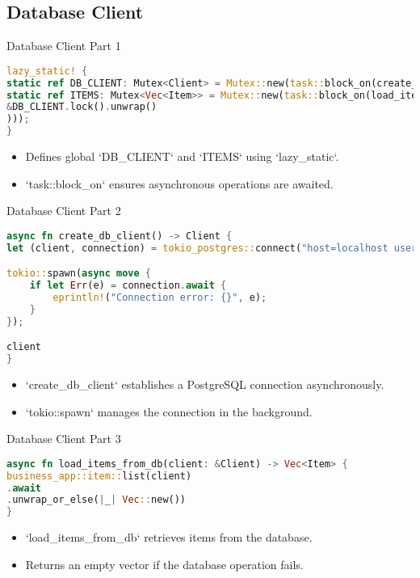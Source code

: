 \documentclass[aspectratio=169, table]{beamer}
\begin{document}
\subsection{Database Client}
\begin{frame}[fragile]{Database Client Part 1}
\begin{lstlisting}[language=Rust]
lazy_static! {
static ref DB_CLIENT: Mutex<Client> = Mutex::new(task::block_on(create_db_client()));
static ref ITEMS: Mutex<Vec<Item>> = Mutex::new(task::block_on(load_items_from_db(
&DB_CLIENT.lock().unwrap()
)));
}
\end{lstlisting}

\begin{itemize}
\item Defines global `DB\_CLIENT` and `ITEMS` using `lazy\_static`.
\item `task::block\_on` ensures asynchronous operations are awaited.
\end{itemize}
\end{frame}

\begin{frame}[fragile]{Database Client Part 2}
\vspace{15pt}
\begin{lstlisting}[language=Rust]
async fn create_db_client() -> Client {
let (client, connection) = tokio_postgres::connect("host=localhost user=postgres password=1234 dbname=session10", NoTls, ).await.unwrap();

tokio::spawn(async move {
	if let Err(e) = connection.await {
		eprintln!("Connection error: {}", e);
	}
});

client
}
\end{lstlisting}

\begin{itemize}
\item `create\_db\_client` establishes a PostgreSQL connection asynchronously.
\item `tokio::spawn` manages the connection in the background.
\end{itemize}
\end{frame}

\begin{frame}[fragile]{Database Client Part 3}
\begin{lstlisting}[language=Rust]
async fn load_items_from_db(client: &Client) -> Vec<Item> {
business_app::item::list(client)
.await
.unwrap_or_else(|_| Vec::new())
}
\end{lstlisting}

\begin{itemize}
\item `load\_items\_from\_db` retrieves items from the database.
\item Returns an empty vector if the database operation fails.
\end{itemize}
\end{frame}
\end{document}
